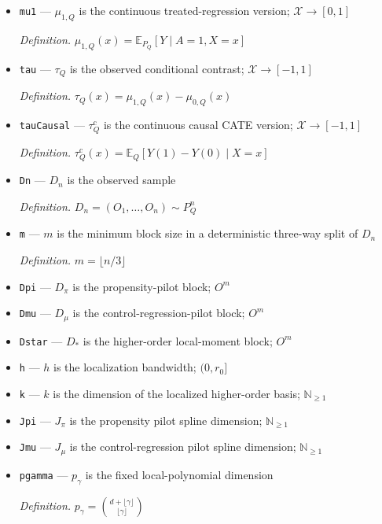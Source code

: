 \documentclass{article}
\begin{document}
\begin{itemize}
  \par\smallskip\noindent\emph{Definition.} \(\mu_{0,Q}(x)=\mathbb E_{P_Q}[Y\mid A=0,X=x]\)
  \item \texttt{mu1} --- \(\mu_{1,Q}\) is the continuous treated-regression version; \(\mathcal X\to[0,1]\)
  \par\smallskip\noindent\emph{Definition.} \(\mu_{1,Q}(x)=\mathbb E_{P_Q}[Y\mid A=1,X=x]\)
  \item \texttt{tau} --- \(\tau_Q\) is the observed conditional contrast; \(\mathcal X\to[-1,1]\)
  \par\smallskip\noindent\emph{Definition.} \(\tau_Q(x)=\mu_{1,Q}(x)-\mu_{0,Q}(x)\)
  \item \texttt{tauCausal} --- \(\tau_Q^{\mathrm c}\) is the continuous causal CATE version; \(\mathcal X\to[-1,1]\)
  \par\smallskip\noindent\emph{Definition.} \(\tau_Q^{\mathrm c}(x)=\mathbb E_Q[Y(1)-Y(0)\mid X=x]\)
  \item \texttt{Dn} --- \(D_n\) is the observed sample
  \par\smallskip\noindent\emph{Definition.} \(D_n=(O_1,\ldots,O_n)\sim P_Q^n\)
  \item \texttt{m} --- \(m\) is the minimum block size in a deterministic three-way split of \(D_n\)
  \par\smallskip\noindent\emph{Definition.} \(m=\lfloor n/3\rfloor\)
  \item \texttt{Dpi} --- \(D_\pi\) is the propensity-pilot block; \(O^m\)
  \item \texttt{Dmu} --- \(D_\mu\) is the control-regression-pilot block; \(O^m\)
  \item \texttt{Dstar} --- \(D_*\) is the higher-order local-moment block; \(O^m\)
  \item \texttt{h} --- \(h\) is the localization bandwidth; \((0,r_0]\)
  \item \texttt{k} --- \(k\) is the dimension of the localized higher-order basis; \(\mathbb N_{\ge 1}\)
  \item \texttt{Jpi} --- \(J_\pi\) is the propensity pilot spline dimension; \(\mathbb N_{\ge 1}\)
  \item \texttt{Jmu} --- \(J_\mu\) is the control-regression pilot spline dimension; \(\mathbb N_{\ge 1}\)
  \item \texttt{pgamma} --- \(p_\gamma\) is the fixed local-polynomial dimension
  \par\smallskip\noindent\emph{Definition.} \(p_\gamma={d+\lfloor\gamma\rfloor\choose\lfloor\gamma\rfloor}\)

\end{itemize}
\end{document}
